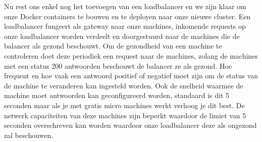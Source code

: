 \documentclass{article}
\begin{document}
	\par
	Nu rest ons enkel nog het toevoegen van een loadbalancer en we zijn klaar om onze Docker containers te bouwen en te deployen naar onze nieuwe cluster. Een loadbalancer fungeert als gateway naar onze machines, inkomende requests op onze loadbalancer worden verdeelt en doorgestuurd naar de machines die de balancer als gezond beschouwt. Om de gezondheid van een machine te controleren doet deze periodiek een request naar de machines, zolang de machines met een status 200 antwoorden beschouwt de balancer ze als gezond. Hoe frequent en hoe vaak een antwoord positief of negatief moet zijn om de status van de machine te veranderen kan ingesteld worden. Ook de snelheid waarmee de machine moet antwoorden kan geconfigureerd worden, standaard is dit 5 seconden maar als je met gratis micro machines werkt verhoog je dit best. De netwerk capaciteiten van deze machines zijn beperkt waardoor de limiet van 5 seconden overschreven kan worden waardoor onze loadbalancer deze als ongezond zal beschouwen.
	\par
	
\end{document}
